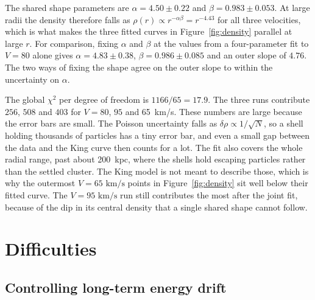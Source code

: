 \documentclass[12pt,a4paper]{article}
\begin{document}
\begin{table}[htbp]
    \centering
    \caption{King-model parameters at the production tolerance
        $\mathrm{tol}=\SI{0.1332}{kpc}$. The uncertainties are
        one-standard-deviation errors from the weighted fit. $\alpha$ and $\beta$
        are shared by all three runs and are fitted from them jointly, so the same
        pair of values, and the same uncertainty on each, is listed in every row.}
    \label{tab:king}
    
\end{table}

The shared shape parameters are $\alpha=4.50\pm0.22$ and
$\beta=0.983\pm0.053$. At large radii the density therefore falls as
$\rho(r)\propto r^{-\alpha\beta}=r^{-4.43}$ for all three velocities, which is
what makes the three fitted curves in Figure~\ref{fig:density} parallel at
large $r$. For comparison, fixing $\alpha$ and $\beta$ at the values from a
four-parameter fit to $V=80$ alone gives $\alpha=4.83\pm0.38$,
$\beta=0.986\pm0.085$ and an outer slope of $4.76$. The two ways of fixing the
shape agree on the outer slope to within the uncertainty on $\alpha$.

The global $\chi^2$ per degree of freedom is $1166/65=17.9$. The three runs
contribute $256$, $508$ and $403$ for $V=80$, $95$ and \SI{65}{km/s}. These
numbers are large because the error bars are small. The Poisson uncertainty
falls as $\delta\rho\propto1/\sqrt{N}$, so a shell holding thousands of
particles has a tiny error bar, and even a small gap between the data and the
King curve then counts for a lot. The fit also covers the whole radial range,
past about \SI{200}{kpc}, where the shells hold escaping particles rather than
the settled cluster. The King model is not meant to describe those, which is
why the outermost $V=65\text{ km/s}$ points in Figure~\ref{fig:density} sit
well below their fitted curve. The $V=95\text{ km/s}$ run still contributes
the most after the joint fit, because of the dip in its central density that a
single shared shape cannot follow.

\FloatBarrier
\section{Difficulties}\label{sec:difficulties}

\subsection{Controlling long-term energy drift}
\end{document}
